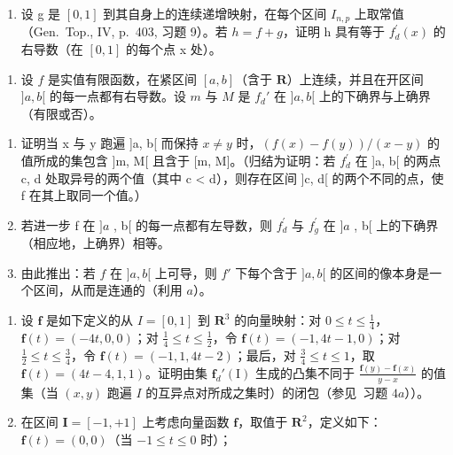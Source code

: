 \begin{enumerate}
\def\labelenumi{\alph{enumi})}
\setcounter{enumi}{1}
\tightlist
\item
  设 g 是 \([0, 1]\) 到其自身上的连续递增映射，在每个区间 \(I_{n,p}\) 上取常值（Gen.~Top., IV, p.~403, 习题 9）。若 \(h = f + g\)，证明 h 具有等于 \(f_{d}^{\prime}(x)\) 的右导数（在 \([0, 1]\) 的每个点 x 处）。
\end{enumerate}

\begin{enumerate}
\def\labelenumi{\arabic{enumi})}
\setcounter{enumi}{3}
\tightlist
\item
  设 \(f\) 是实值有限函数，在紧区间 \([a, b]\)（含于 \(\mathbf{R}\)）上连续，并且在开区间 \(]a, b[\) 的每一点都有右导数。设 \(m\) 与 \(M\) 是 \(f_d'\) 在 \(]a, b[\) 上的下确界与上确界（有限或否）。
\end{enumerate}

\begin{enumerate}
\def\labelenumi{\alph{enumi})}
\item
  证明当 x 与 y 跑遍 {]}a, b{[} 而保持 \(x \neq y\) 时，\((f(x) - f(y))/(x - y)\) 的值所成的集包含 {]}m, M{[} 且含于 {[}m, M{]}。（归结为证明：若 \(f_{d}^{\prime}\) 在 {]}a, b{[} 的两点 c, d 处取异号的两个值（其中 c \textless{} d），则存在区间 {]}c, d{[} 的两个不同的点，使 f 在其上取同一个值。）
\item
  若进一步 f 在 \(]a\) , b{[} 的每一点都有左导数，则 \(f_{d}^{\prime}\) 与 \(f_{g}^{\prime}\) 在 \(]a\) , b{[} 上的下确界（相应地，上确界）相等。
\item
  由此推出：若 \(f\) 在 \(]a, b[\) 上可导，则 \(f'\) 下每个含于 \(]a, b[\) 的区间的像本身是一个区间，从而是连通的（利用 \(a\)）。
\end{enumerate}

\begin{enumerate}
\def\labelenumi{\arabic{enumi})}
\setcounter{enumi}{4}
\item
  设 \(\mathbf{f}\) 是如下定义的从 \(I = [0, 1]\) 到 \(\mathbf{R}^3\) 的向量映射：对 \(0 \leqslant t \leqslant \frac{1}{4}\)，\(\mathbf{f}(t) = (-4t, 0, 0)\)；对 \(\frac{1}{4} \leqslant t \leqslant \frac{1}{2}\)，令 \(\mathbf{f}(t) = (-1, 4t - 1, 0)\)；对 \(\frac{1}{2} \leqslant t \leqslant \frac{3}{4}\)，令 \(\mathbf{f}(t) = (-1, 1, 4t - 2)\)；最后，对 \(\frac{3}{4} \leqslant t \leqslant 1\)，取 \(\mathbf{f}(t) = (4t - 4, 1, 1)\)。证明由集 \(\mathbf{f}_d'(\mathrm{I})\) 生成的凸集不同于 \(\frac{\mathbf{f}(y) - \mathbf{f}(x)}{y - x}\) 的值集（当 \((x, y)\) 跑遍 \(I\) 的互异点对所成之集时）的闭包（参见~习题 \(4a\)））。
\item
  在区间 \(\mathbf{I} = [-1, + 1]\) 上考虑向量函数 \(\mathbf{f}\)，取值于 \(\mathbf{R}^2\)，定义如下：\(\mathbf{f}(t) = (0,0)\)（当 \(-1\leqslant t\leqslant 0\) 时）；
\end{enumerate}

